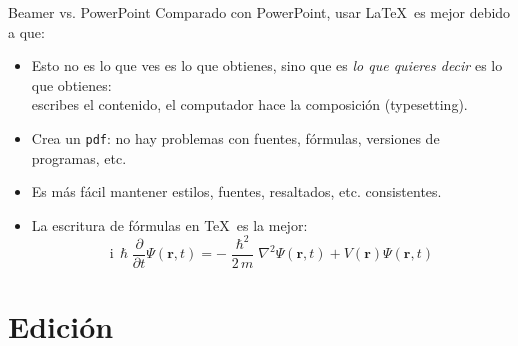 \documentclass{sintefbeamer}
\begin{document}
\begin{frame}{Beamer vs. PowerPoint}
Comparado con PowerPoint, usar \LaTeX\ es mejor debido a que:
\begin{itemize}
\item Esto no es lo que ves es lo que obtienes, sino que es \emph{lo que quieres decir} es lo que obtienes:\\
escribes el contenido, el computador hace la composición (typesetting).
\item Crea un \texttt{pdf}: no hay problemas con fuentes, fórmulas,
      versiones de programas, etc.
\item Es más fácil mantener estilos, fuentes, resaltados, etc. consistentes.
\item La escritura de fórmulas en \TeX\ es la mejor:
\begin{equation*}
\mathrm{i}\,\hslash\frac{\partial}{\partial t} \Psi(\mathbf{r},t) =
-\frac{\hslash^2}{2\,m}\nabla^2\Psi(\mathbf{r},t)
+ V(\mathbf{r})\Psi(\mathbf{r},t)
\end{equation*}

\end{itemize}
\end{frame}

\section{Edición}

\end{document}
